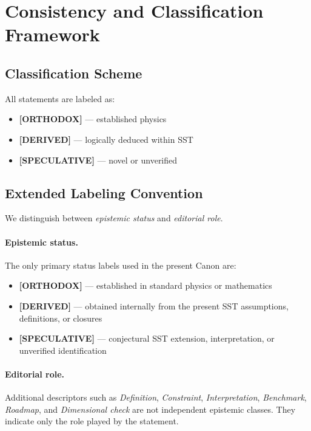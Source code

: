 \documentclass[11pt]{article}
\theoremstyle{definition}
\theoremstyle{plain}
\theoremstyle{remark}
\begin{document}
\section{Consistency and Classification Framework}
    \label{sec:consistency}
    
    \subsection{Classification Scheme}
        
        All statements are labeled as:
        
        \begin{itemize}
            \item \textbf{[ORTHODOX]} — established physics
            \item \textbf{[DERIVED]} — logically deduced within SST
            \item \textbf{[SPECULATIVE]} — novel or unverified
        \end{itemize}

    \subsection{Extended Labeling Convention}

        We distinguish between \emph{epistemic status} and \emph{editorial role}.

        \paragraph{Epistemic status.}
        The only primary status labels used in the present Canon are:
        \begin{itemize}
            \item \textbf{[ORTHODOX]} --- established in standard physics or mathematics
            \item \textbf{[DERIVED]} --- obtained internally from the present SST assumptions, definitions, or closures
            \item \textbf{[SPECULATIVE]} --- conjectural SST extension, interpretation, or unverified identification
        \end{itemize}

        \paragraph{Editorial role.}
        Additional descriptors such as \emph{Definition}, \emph{Constraint}, \emph{Interpretation}, \emph{Benchmark}, \emph{Roadmap}, and \emph{Dimensional check} are not independent epistemic classes. They indicate only the role played by the statement.
\end{document}
